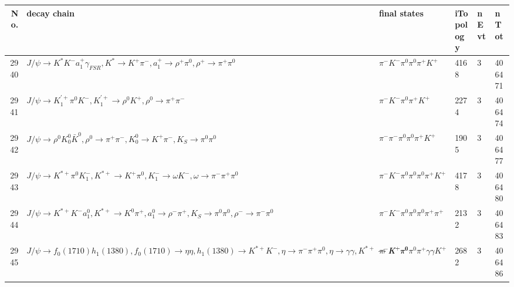 \begin{table}[htbp] 
\begin{center}
\begin{small}
\begin{tabular}{rlllll}\hline\hline
 No. & decay chain & final states &  iTopology & nEvt & nTot \\\hline
2940&$J/\psi       \rightarrow K^{*}          K^{-}          a_{1}^{+}      \gamma_{FSR} , K^{*}           \rightarrow K^{+}          \pi^{-}        , a_{1}^{+}       \rightarrow \rho^{+}      \pi^{0}        , \rho^{+}       \rightarrow \pi^{+}        \pi^{0}        $&$\pi^{-}        K^{-}          \pi^{0}        \pi^{0}        \pi^{+}        K^{+}          $& 4168&    3&406471\\
2941&$J/\psi       \rightarrow K_1^{'+}      \pi^{0}        K^{-}          , K_1^{'+}       \rightarrow \rho^{0}      K^{+}          , \rho^{0}       \rightarrow \pi^{+}        \pi^{-}        $&$\pi^{-}        K^{-}          \pi^{0}        \pi^{+}        K^{+}          $& 2274&    3&406474\\
2942&$J/\psi       \rightarrow \rho^{0}      K_0^{0}        \bar{K}^{0}   , \rho^{0}       \rightarrow \pi^{+}        \pi^{-}        , K_0^{0}         \rightarrow K^{+}          \pi^{-}        , K_{S}           \rightarrow \pi^{0}        \pi^{0}        $&$\pi^{-}        \pi^{-}        \pi^{0}        \pi^{0}        \pi^{+}        K^{+}          $& 1905&    3&406477\\
2943&$J/\psi       \rightarrow K^{*+}         \pi^{0}        K_{1}^{-}      , K^{*+}          \rightarrow K^{+}          \pi^{0}        , K_{1}^{-}       \rightarrow \omega         K^{-}          , \omega          \rightarrow \pi^{-}        \pi^{+}        \pi^{0}        $&$\pi^{-}        K^{-}          \pi^{0}        \pi^{0}        \pi^{0}        \pi^{+}        K^{+}          $& 4178&    3&406480\\
2944&$J/\psi       \rightarrow K^{*+}         K^{-}          a_{1}^{0}      , K^{*+}          \rightarrow K^{0}          \pi^{+}        , a_{1}^{0}       \rightarrow \rho^{-}      \pi^{+}        , K_{S}           \rightarrow \pi^{0}        \pi^{0}        , \rho^{-}       \rightarrow \pi^{-}        \pi^{0}        $&$\pi^{-}        K^{-}          \pi^{0}        \pi^{0}        \pi^{0}        \pi^{+}        \pi^{+}        $& 2132&    3&406483\\
2945&$J/\psi       \rightarrow f_{0}(1710)    h_{1}(1380)    , f_{0}(1710)     \rightarrow \eta          \eta          , h_{1}(1380)     \rightarrow K^{*+}         K^{-}          , \eta           \rightarrow \pi^{-}        \pi^{+}        \pi^{0}        , \eta           \rightarrow \gamma       \gamma       , K^{*+}          \rightarrow K^{+}          \pi^{0}        $&$\pi^{-}        K^{-}          \pi^{0}        \pi^{0}        \pi^{+}        \gamma       \gamma       K^{+}          $& 2682&    3&406486\\

\end{tabular}
\end{small}
\end{center}
\end{table}
